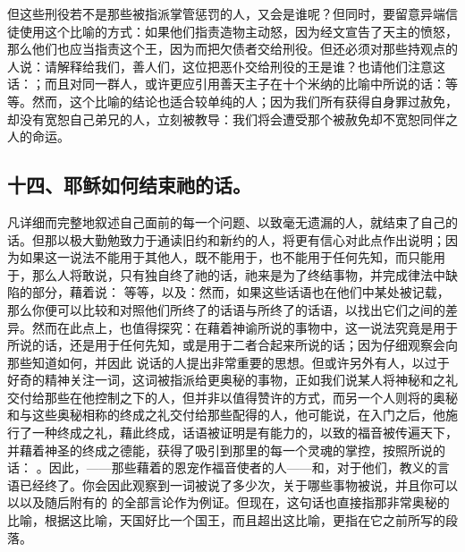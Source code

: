 但这些刑役若不是那些被指派掌管惩罚的人，又会是谁呢？但同时，要留意异端信徒使用这个比喻的方式：如果他们指责造物主动怒，因为经文宣告了天主的愤怒，那么他们也应当指责这个王，因为而把欠债者交给刑役。但还必须对那些持观点的人说：请解释给我们，善人们，这位把恶仆交给刑役的王是谁？也请他们注意这话：；而且对同一群人，或许更应引用善天主子在十个米纳的比喻中所说的话：等等。然而，这个比喻的结论也适合较单纯的人；因为我们所有获得自身罪过赦免，却没有宽恕自己弟兄的人，立刻被教导：我们将会遭受那个被赦免却不宽恕同伴之人的命运。\par


\subsection{十四、耶稣如何结束祂的话。}

  凡详细而完整地叙述自己面前的每一个问题、以致毫无遗漏的人，就结束了自己的话。但那以极大勤勉致力于通读旧约和新约的人，将更有信心对此点作出说明；因为如果这一说法不能用于其他人，既不能用于，也不能用于任何先知，而只能用于，那么人将敢说，只有独自终了祂的话，祂来是为了终结事物，并完成律法中缺陷的部分，藉着说： 等等，以及：然而，如果这些话语也在他们中某处被记载，那么你便可以比较和对照他们所终了的话语与所终了的话语，以找出它们之间的差异。然而在此点上，也值得探究：在藉着神谕所说的事物中，这一说法究竟是用于所说的话，还是用于任何先知，或是用于二者合起来所说的话；因为仔细观察会向那些知道如何，并因此 说话的人提出非常重要的思想。但或许另外有人，以过于好奇的精神关注一词，这词被指派给更奥秘的事物，正如我们说某人将神秘和之礼交付给那些在他控制之下的人，但并非以值得赞许的方式，而另一个人则将的奥秘和与这些奥秘相称的终成之礼交付给那些配得的人，他可能说，在入门之后，他施行了一种终成之礼，藉此终成，话语被证明是有能力的，以致的福音被传遍天下，并藉着神圣的终成之德能，获得了吸引到那里的每一个灵魂的掌控，按照所说的话： 。因此，——那些藉着的恩宠作福音使者的人——和，对于他们，教义的言语已经终了。你会因此观察到一词被说了多少次，关于哪些事物被说，并且你可以以以及随后附有的 的全部言论作为例证。但现在，这句话也直接指那非常奥秘的比喻，根据这比喻，天国好比一个国王，而且超出这比喻，更指在它之前所写的段落。\par

